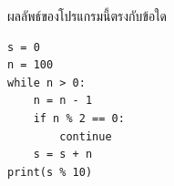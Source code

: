 \question ผลลัพธ์ของโปรแกรมนี้ตรงกับข้อใด
\begin{verbatim}
s = 0
n = 100
while n > 0:
    n = n - 1
    if n % 2 == 0:
        continue
    s = s + n
print(s % 10)
\end{verbatim}
